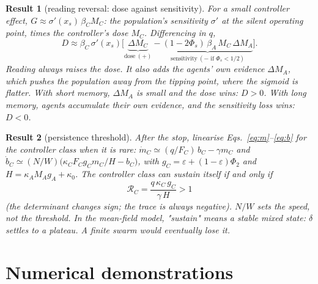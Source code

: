 \documentclass[10pt,a4paper]{article}
\newtheorem{result}{Result}
\begin{document}
\begin{result}[reading reversal: dose against sensitivity]
For a small controller effect, $G\approx\sigma'(x_s)\,\beta_C M_C$: the population's \emph{sensitivity} $\sigma'$ at the
silent operating point, times the controller's \emph{dose} $M_C$. Differencing in $q$,
\begin{equation}
D\approx\beta_C\,\sigma'(x_s)\Big[\underbrace{\Delta M_C}_{\text{dose}\ (+)}-\underbrace{(1-2\Phi_s)\,\beta_A\,M_C\,\Delta M_A}_{\text{sensitivity}\ (-\text{ if }\Phi_s<1/2)}\Big].\label{eq:reversal}
\end{equation}
Reading always raises the dose. It also adds the agents' own evidence $\Delta M_A$, which pushes the population away
from the tipping point, where the sigmoid is flatter. With short memory, $\Delta M_A$ is small and the dose wins:
$D>0$. With long memory, agents accumulate their own evidence, and the sensitivity loss wins: $D<0$.
\end{result}

\begin{result}[persistence threshold]
After the stop, linearise Eqs.~\eqref{eq:m}--\eqref{eq:b} for the controller class when it is rare:
$\dot m_C\simeq (q/F_C)\,b_C-\gamma m_C$ and $\dot b_C\simeq (N/W)\big(\kappa_C F_C g_C m_C/H-b_C\big)$, with
$g_C=\varepsilon+(1-\varepsilon)\Phi_2$ and $H=\kappa_A M_A g_A+\kappa_0$. The controller class can sustain itself if
and only if
\begin{equation}\boxed{\ \mathcal R_C=\frac{q\,\kappa_C\,g_C}{\gamma\,H}>1\ }\label{eq:R}\end{equation}
(the determinant changes sign; the trace is always negative). $N/W$ sets the speed, not the threshold. In the mean-field
model, "sustain" means a stable mixed state: $\delta$ settles to a plateau. A finite swarm would eventually lose it.
\end{result}

\section{Numerical demonstrations}
\end{document}
